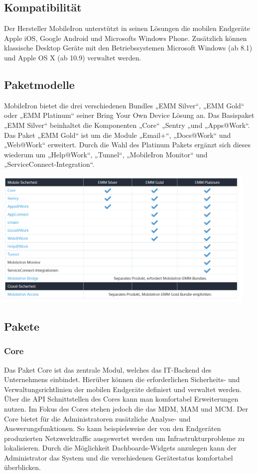 \subsection {Kompatibilität}
Der Hersteller MobileIron unterstützt in seinen Lösungen die  mobilen Endgeräte Apple iOS, Google Android und Microsofts Windows Phone. Zusätzlich können klassische Desktop Geräte mit den Betriebssystemen Microsoft Windows (ab 8.1) und Apple OS X (ab 10.9)  verwaltet werden. 
\subsection {Paketmodelle}
MobileIron bietet die drei verschiedenen Bundles „EMM Silver“, „EMM Gold“ oder „EMM Platinum“ seiner Bring Your Own Device Lösung an.
Das Basispaket „EMM Silver“ beinhaltet die Komponenten „Core“ „Sentry „und „Apps@Work“. Das Paket „EMM Gold“ ist um die Module „Email+“, „Docs@Work“ und „Web@Work“ erweitert. Durch die Wahl des Platinum Pakets ergänzt sich dieses wiederum um „Help@Work“, „Tunnel“, „MobileIron Monitor“ und „ServiceConnect-Integration“.

\includegraphics[width=0.95\textwidth]{Bilder/mi_1.png} 

\subsection {Pakete}
\subsubsection {Core}
Das Paket Core ist das zentrale Modul, welches das IT-Backend des Unternehmens einbindet. Hierüber können die erforderlichen Sicherheits- und Verwaltungsrichtlinien der mobilen Endgeräte definiert und verwaltet werden. Über die  API Schnittstellen des Cores kann man komfortabel Erweiterungen nutzen. Im Fokus des Cores stehen jedoch die das MDM, MAM und MCM. Der Core bietet für die Administratoren zusätzliche Analyse- und Auswerungsfunktionen. So kann beispielsweise der von den Endgeräten produzierten Netzwerktraffic ausgewertet werden um Infrastrukturprobleme zu lokalisieren. Durch die Möglichkeit Dachboards-Widgets anzulegen kann der Administrator das System und die verschiedenen Gerätestatus komfortabel überblicken. 
